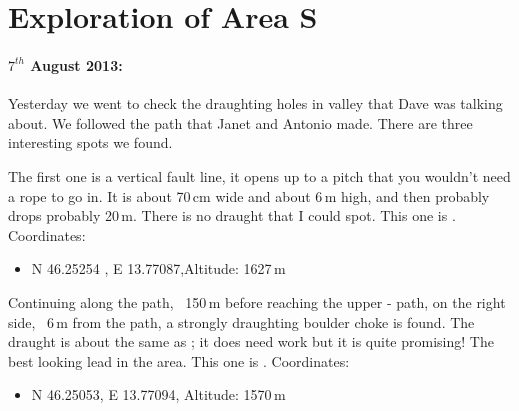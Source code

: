 \section{Exploration of Area S}




\paragraph{$7^{th}$ August 2013: } Yesterday we went to check the draughting holes in  valley that Dave was talking about. We followed the path that Janet and Antonio made. There are three interesting spots we found.

The first one is a vertical fault line, it opens up to a pitch that you wouldn't need a rope to go in. It is about 70\,cm wide and about 6\,m high, and then probably drops probably 20\,m. There is no draught that I could spot.
This one is . Coordinates:

\begin{itemize}
	\item N 46.25254 , E 13.77087,Altitude: 1627\,m
\end{itemize}


Continuing along the path, ~150\,m before reaching the upper - path, on the right side, ~6\,m from the path, a strongly draughting boulder choke is found. The draught is about the same as ; it does need work but it is quite promising! The best looking lead in the area.
This one is . Coordinates:

\begin{itemize}
	\item N 46.25053, E 13.77094, Altitude: 1570\,m
\end{itemize}

